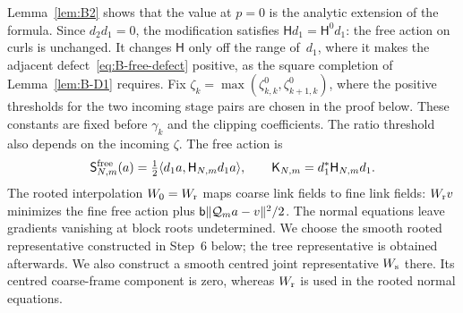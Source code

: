 Lemma~\ref{lem:B2} shows that the value at $p=0$ is the analytic extension of the formula. Since $d_2d_1=0$, the modification satisfies $\mathsf Hd_1=\mathsf H^0d_1$: the free action on curls is unchanged. It changes $\mathsf H$ only off the range of~$d_1$, where it makes the adjacent defect~\eqref{eq:B-free-defect} positive, as the square completion of Lemma~\ref{lem:B-D1} requires. Fix $\zeta_k=\max(\zeta^0_{k,k},\zeta^0_{k+1,k})$, where the positive thresholds for the two incoming stage pairs are chosen in the proof below. These constants are fixed before $\gamma_k$ and the clipping coefficients. The ratio threshold also depends on the incoming $\zeta$. The free action is
\begin{equation*}
\mathsf S^{\rm free}_{N,m}(a)=\tfrac12\langle d_1a,\mathsf H_{N,m}d_1a\rangle,\qquad
\mathsf K_{N,m}=d_1^*\mathsf H_{N,m}d_1.
\end{equation*}
The rooted interpolation $W_0=W_{\rm r}$ maps coarse link fields to fine link fields: $W_{\rm r}v$ minimizes the fine free action plus $\mathsf{b}\|\mathcal Q_ma-v\|^2/2$. The normal equations leave gradients vanishing at block roots undetermined. We choose the smooth rooted representative constructed in Step~6 below; the tree representative is obtained afterwards. We also construct a smooth centred joint representative $W_{\rm s}$ there. Its centred coarse-frame component is zero, whereas $W_{\rm r}$ is used in the rooted normal equations.

